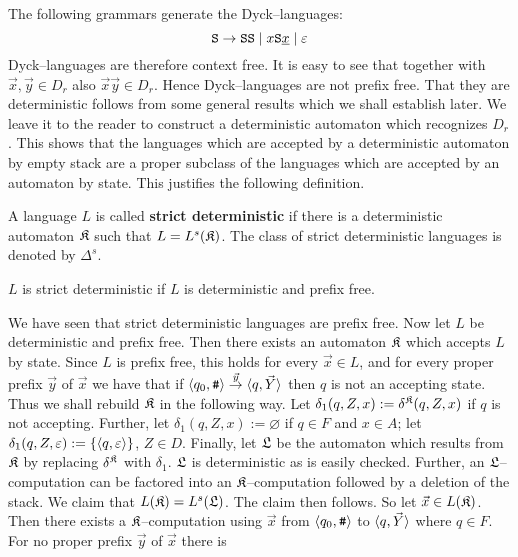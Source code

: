 The following grammars generate the Dyck--languages:
\begin{equation}
\mbox{\tt S} \rightarrow \mbox{\tt SS} \mid x\mbox{\tt S}\underline{x}
\mid \varepsilon
\end{equation}
Dyck--languages are therefore context free. It is easy to see
that together with $\vec{x}, \vec{y} \in D_r$ also
$\vec{x}\vec{y} \in D_r$. Hence Dyck--languages are not prefix
free. That they are deterministic follows from some general
results which we shall establish later. We leave it to the
reader to construct a deterministic automaton which recognizes
$D_r$. This shows that the languages which are accepted by
a deterministic automaton by empty stack are a proper subclass
of the languages which are accepted by an automaton by
state.  This justifies the following definition.
\begin{defn}
A language $L$ is called \textbf{strict deterministic} if there
is a deterministic automaton $\mathfrak{K}$ such that
$L = L^s(\mathfrak{K})$. The class of strict deterministic languages
is denoted by $\Delta^s$.
\end{defn}
\begin{thm}
\label{thm:praefixfrei}
$L$ is strict deterministic if $L$ is
deterministic and prefix free.
\end{thm}
\proofbeg
We have seen that strict deterministic languages are prefix free.
Now let $L$ be deterministic and prefix free. Then there exists an
automaton  $\mathfrak{K}$ which accepts $L$ by state. Since $L$ is prefix
free, this holds for every $\vec{x} \in L$, and for every proper
prefix $\vec{y}$ of $\vec{x}$ we have that if $\langle q_0, \mbox{\tt \#}\rangle
\stackrel{\vec{y}}{\rightarrow} \langle q, \vec{Y}\rangle$ then $q$ is not an
accepting state. Thus we shall rebuild $\mathfrak{K}$ in the following way.
Let $\delta_1(q,Z,x) := \delta^{\mathfrak{K}}(q,Z,x)$ if $q$ is not
accepting. Further, let $\delta_1(q,Z,x) := \varnothing$
if $q \in F$ and $x \in A$; let $\delta_1(q,Z,\varepsilon) :=
\{\langle q,\varepsilon\rangle\}$, $Z \in D$. Finally, let $\mathfrak{L}$ be
the automaton which results from $\mathfrak{K}$ by replacing
$\delta^{\mathfrak{K}}$ with $\delta_1$. $\mathfrak{L}$ is deterministic as
is easily checked. Further, an $\mathfrak{L}$--computation can be
factored into an $\mathfrak{K}$--computation followed by a deletion
of the stack. We claim that $L(\mathfrak{K}) = L^s(\mathfrak{L})$. The claim
then follows. So let $\vec{x} \in L(\mathfrak{K})$.
Then there exists a $\mathfrak{K}$--computation using $\vec{x}$
from $\langle q_0, \mbox{\tt \#}\rangle$ to $\langle q, \vec{Y}\rangle$ where
$q \in F$. For no proper prefix $\vec{y}$ of $\vec{x}$ there is
